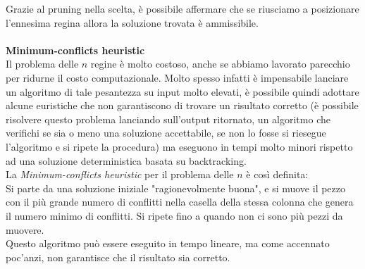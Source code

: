 \documentclass[../cheatSheetAlgoritmi.tex]{subfiles}
\begin{document}
Grazie al pruning nella scelta, è possibile affermare che se riusciamo a posizionare l'ennesima regina allora la soluzione trovata è ammissibile. \\\\
\textbf{Minimum-conflicts heuristic} \\
Il problema delle $n$ regine è molto costoso, anche se abbiamo lavorato parecchio per ridurne il costo computazionale. Molto spesso infatti è impensabile lanciare un algoritmo di tale pesantezza su input molto elevati, è possibile quindi adottare alcune euristiche che non garantiscono di trovare un risultato corretto (è possibile risolvere questo problema lanciando sull'output ritornato, un algoritmo che verifichi se sia o meno una soluzione accettabile, se non lo fosse si riesegue l'algoritmo e si ripete la procedura) ma eseguono in tempi molto minori rispetto ad una soluzione deterministica basata su backtracking. \\
La \emph{Minimum-conflicts heuristic} per il problema delle $n$ è così definita: \\
Si parte da una soluzione iniziale "ragionevolmente buona", e si muove il pezzo con il più grande numero di conflitti nella casella della stessa colonna che genera il numero minimo di conflitti. Si ripete fino a quando non ci sono più pezzi da muovere. \\
Questo algoritmo può essere eseguito in tempo lineare, ma come accennato poc'anzi, non garantisce che il risultato sia corretto.
\newpage
\end{document}
